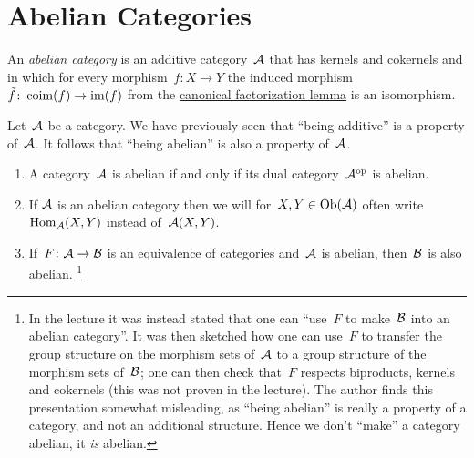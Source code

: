\section{Abelian Categories}


\begin{definition}
  An \emph{abelian category} is an additive category~$\mathcal{A}$ that has kernels and cokernels and in which for every morphism~$f \colon X \to Y$ the induced morphism~$\tilde{f} \colon \operatorname{coim}(f) \to \operatorname{im}(f)$ from the \hyperref[canonical factorization]{canonical factorization lemma} is an isomorphism.
\end{definition}


\begin{remark*}
  Let~$\mathcal{A}$ be a category.
  We have previously seen that \enquote{being additive} is a property of~$\mathcal{A}$.
  It follows that \enquote{being abelian} is also a property of~$\mathcal{A}$.
\end{remark*}


\begin{remark}
  \leavevmode
  \begin{enumerate}
    \item
      A category~$\mathcal{A}$ is abelian if and only if its dual category~$\mathcal{A}^{\mathrm{op}}$ is abelian.
    \item
      If $\mathcal{A}$ is an abelian category then we will for~$X, Y \in \operatorname{Ob}(\mathcal{A})$ often write~$\operatorname{Hom}_{\mathcal{A}}(X,Y)$ instead of~$\mathcal{A}(X,Y)$.
    \item
      If~$F \colon \mathcal{A} \to \mathcal{B}$ is an equivalence of categories and~$\mathcal{A}$ is abelian, then~$\mathcal{B}$ is also abelian.%
      \footnote{In the lecture it was instead stated that one can \enquote{use~$F$ to make~$\mathcal{B}$ into an abelian category}.
      It was then sketched how one can use~$F$ to transfer the group structure on the morphism sets of~$\mathcal{A}$ to a group structure of the morphism sets of~$\mathcal{B}$;
      one can  then check that~$F$ respects biproducts, kernels and cokernels (this was not proven in the lecture).
      The author finds this presentation somewhat misleading, as \enquote{being abelian} is really a property of a category, and not an additional structure.
      Hence we don’t \enquote{make} a category abelian, it \emph{is} abelian.}
  \end{enumerate}
\end{remark}


